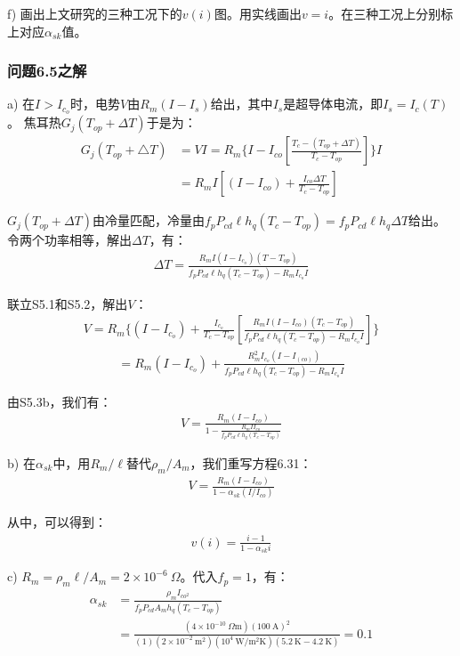 f) 画出上文研究的三种工况下的$v(i)$图。用实线画出$v=i$。在三种工况上分别标上对应$\alpha_{sk}$值。


\subsubsection{问题6.5之解}
a) 在$I> I_{c_o}$时，电势$V$由$R_m(I-I_s)$给出，其中$I_s$是超导体电流，即$I_s=I_c(T)$。
焦耳热$G_j(T_{op}+\Delta T)$于是为：
\begin{align*}%
G_{j}(T_{op}+\triangle T)&=VI=R_m\{I-I_{co}[\frac{T_c-(T_{op}+\Delta T)}{T_c-T_{op}}]\}I\\
&=R_mI[(I-I_{co})+\frac{I_{co}\Delta T}{T_c-T_{op}}] \tag{S5.1}
\end{align*}

$G_j(T_{op}+\Delta T)$由冷量匹配，冷量由$f_pP_{cd}\ell h_q(T_c-T_{op})=f_pP_{cd}\ell h_q\Delta T$给出。
令两个功率相等，解出$\Delta T$，有：
\begin{align*}%
\Delta T=\frac{R_mI(I-I_{c_o})(T-T_{op})}{f_pP_{cd}\ell h_q(T_c-T_{op})-R_mI_{c_o}I} \tag{S5.2}
\end{align*}

联立S5.1和S5.2，解出$V$：
\begin{align*}%
V=R_m\{(I-I_{c_o})+\frac{I_{c_o}}{T_c-T_{op}}[\frac{R_mI(I-I_{co})(T_c-T_{op})}{f_pP_{cd}\ell h_q(T_c-T_{op})-R_mI_{c_o}I}]\} \tag{S5.3a}
\end{align*}
\begin{align*}%
=R_m(I-I_{c_o})+\frac{R_m^2I_{c_o}(I-I_(co))}{f_pP_{cd}\ell h_q(T_c-T_{op})-R_mI_{c_o}I} \tag{S5.3b}
\end{align*}

由S5.3b，我们有：
\begin{align*}%
V=\frac{R_m(I-I_{co})}{1-\frac{R_mII_{co}}{f_pP_{cd}\ell h_q(T_c-T_{op})}} \tag{6.31}
\end{align*}

b) 在$\alpha_{sk}$中，用$R_m/\ell$替代$\rho_m/A_m$，我们重写方程6.31：
\begin{align*}%
V=\frac{R_m(I-I_{co})}{1-\alpha_{sk}(I/I_{co})} \tag{S5.4}
\end{align*}

从中，可以得到：
\begin{align*}%
v(i)=\frac{i-1}{1-\alpha_{sk}i} \tag{6.32}
\end{align*}

c) $R_m=\rho_m \ell/A_m=2\times 10^{-6}\ \Omega$。代入$f_p=1$，有：
\begin{align*}%
\alpha_{sk}&=\frac{\rho_mI_{co^2}}{f_pP_{cd}A_mh_q(T_c-T_{op})}\\
&=\frac{(4\times10^{-10}\ \Omega\mathrm{m})(100\ \mathrm{A})^2}{(1)(2\times10^{-2}\ \mathrm{m^2})(10^4\ \mathrm{W/m^2K})(5.2\ \mathrm{K}-4.2\ \mathrm{K})}=0.1
\end{align*}

